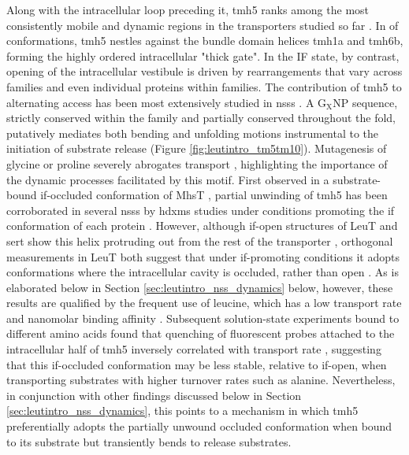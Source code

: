 Along with the intracellular loop preceding it, \gls{tmh}5 ranks among the most consistently mobile and dynamic regions in the transporters studied so far \citep*{Stolzenberg2017}.  In \gls{of} conformations, \gls{tmh}5 nestles against the bundle domain helices \gls{tmh}1a and \gls{tmh}6b, forming the highly ordered intracellular "thick gate". In the IF state, by contrast, opening of the intracellular vestibule is driven by rearrangements that vary across families and even individual proteins within families. The contribution of \gls{tmh}5 to alternating access has been most extensively studied in \gls{nss}s \citep*{Stolzenberg2017}. A $\mathrm{G_{X}NP}$ sequence, strictly conserved within the family and partially conserved throughout the fold, putatively mediates both bending and unfolding motions instrumental to the initiation of substrate release (Figure \ref{fig:leutintro_tm5tm10}). Mutagenesis of glycine or proline severely abrogates transport \citep*{Malinauskaite2014}, highlighting the importance of the dynamic processes facilitated by this motif. First observed in a substrate-bound \gls{if}-occluded conformation of MhsT \citep*{Malinauskaite2014}, partial unwinding of \gls{tmh}5 has been corroborated in several \gls{nss}s by \gls{hdxms} studies under conditions promoting the \gls{if} conformation of each protein \citep*{Adhikary2017, Merkle2018, Moeller2019, Nielsen2019}. However, although \gls{if}-open structures of LeuT and \gls{sert} show this helix protruding out from the rest of the transporter \citep*{Coleman2016, Gotfryd2020, Krishnamurthy2012}, orthogonal measurements in LeuT both suggest that under \gls{if}-promoting conditions it adopts conformations where the intracellular cavity is occluded, rather than open \citep*{Kazmier2014, Shi2008, Zhao2011, Zhao2010}. As is elaborated below in Section \ref{sec:leutintro_nss_dynamics} below, however, these results are qualified by the frequent use of leucine, which has a low transport rate and nanomolar binding affinity \citep*{Singh2008}. Subsequent solution-state experiments bound to different amino acids found that quenching of fluorescent probes attached to the intracellular half of \gls{tmh}5 inversely correlated with transport rate \citep*{Billesbølle2015}, suggesting that this \gls{if}-occluded conformation may be less stable, relative to \gls{if}-open, when transporting substrates with higher turnover rates such as alanine. Nevertheless, in conjunction with other findings discussed below in Section \ref{sec:leutintro_nss_dynamics}, this points to a mechanism in which \gls{tmh}5 preferentially adopts the partially unwound occluded conformation when bound to its substrate but transiently bends to release substrates.

